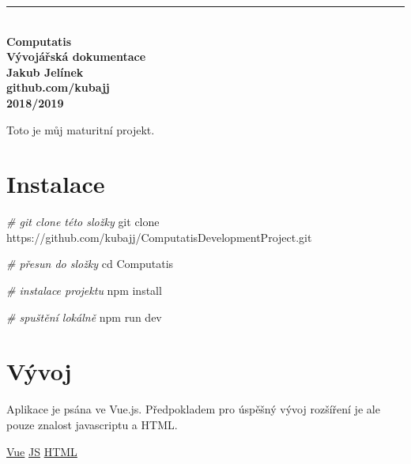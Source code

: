 \documentclass[
]{article}
\date{}
\newenvironment{Shaded}{}{}
\newcommand{\BuiltInTok}[1]{#1}
\newcommand{\CommentTok}[1]{\textcolor[rgb]{0.38,0.63,0.69}{\textit{#1}}}
\newcommand{\ExtensionTok}[1]{#1}
\newcommand{\FunctionTok}[1]{\textcolor[rgb]{0.02,0.16,0.49}{#1}}
\newcommand{\NormalTok}[1]{#1}
\begin{document}
\begin{titlepage}
    \begin{center}
        \vspace{0.2cm}
        \rule{\textwidth}{0.5pt}\\
        \vspace{5cm}
        \textbf{\Huge Computatis}\\
        \vspace{5cm}
        \textbf{\large Vývojářská dokumentace}\\
        \vspace{2cm}
        \textbf{\large Jakub Jelínek}\\
        \textbf{github.com/kubajj}\\
        \vspace*{\fill}
        \textbf{\large 2018/2019}\\
    \end{center}
\end{titlepage}
\newpage
\tableofcontents
\newpage

Toto je můj maturitní projekt.

\hypertarget{instalace}{%
\section{Instalace}\label{instalace}}

\begin{Shaded}
\begin{Highlighting}[]
\CommentTok{# git clone této složky}
\FunctionTok{git}\NormalTok{ clone https://github.com/kubajj/ComputatisDevelopmentProject.git}

\CommentTok{# přesun do složky}
\BuiltInTok{cd}\NormalTok{ Computatis}

\CommentTok{# instalace projektu}
\ExtensionTok{npm}\NormalTok{ install}

\CommentTok{# spuštění lokálně}
\ExtensionTok{npm}\NormalTok{ run dev}
\end{Highlighting}
\end{Shaded}

\hypertarget{vuxfdvoj}{%
\section{Vývoj}\label{vuxfdvoj}}

Aplikace je psána ve Vue.js. Předpokladem pro úspěšný vývoj rozšíření je
ale pouze znalost javascriptu a HTML.

\href{https://vuejs.org/v2/guide/}{Vue}
\href{https://www.w3schools.com/js/}{JS}
\href{https://www.w3schools.com/html/}{HTML}
\end{document}

